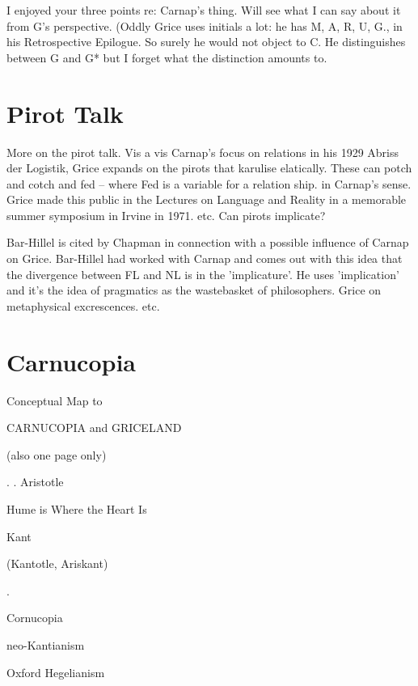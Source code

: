 \documentclass[10pt,titlepage]{book}
\begin{document}
I enjoyed your three points re: Carnap's thing. Will see what I can say  
about it from G's perspective. (Oddly Grice uses initials a lot: he has M, A, 
R,  U, G., in his Retrospective Epilogue. So surely he would not object to 
C. He  distinguishes between G and G* but I forget what the distinction 
amounts  to.
 
\section{Pirot Talk}

More  on the pirot talk. Vis a vis Carnap’s focus on relations in his 1929  
Abriss der Logistik, Grice expands on the pirots that karulise elatically. 
These  can potch and cotch and fed – where Fed is a variable for a relation 
ship. in  Carnap's sense. Grice made this public in the Lectures on Language 
and Reality  in a  memorable summer symposium in Irvine in 1971. etc. 
Can  pirots implicate?

Bar-Hillel  is cited by Chapman in connection with a 
possible influence of Carnap on Grice.  Bar-Hillel had worked with Carnap
and comes out with this idea that the  divergence between FL and NL is in the 
'implicature'. He uses 'implication' and  it's the idea of pragmatics as 
the wastebasket of philosophers. Grice on  metaphysical excrescences. etc.  

\section{Carnucopia}

Conceptual  
 Map
                     to
 
CARNUCOPIA and   GRICELAND
 
      (also one page only)
 
 
                       .
                       .
               Aristotle
 
 
          Hume is Where the  Heart Is
 
                  Kant
 
             (Kantotle, Ariskant)
 
 
                   .
 
Cornucopia
 
neo-Kantianism
 
                                  Oxford Hegelianism
 
\end{document}
